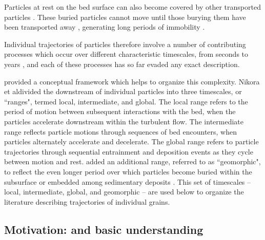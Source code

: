 Particles at rest on the bed surface can also become covered by other transported particles \citep{Yang1971}. 
These buried particles cannot move \DIFdelbegin {}\DIFdelend \DIFaddbegin {}\DIFaddend until those burying them have been transported away \citep{Nakagawa1981}, generating long periods of \DIFaddbegin {}\DIFaddend immobility \citep{Hassan1994,Ferguson2002}.

Individual trajectories of particles therefore involve a number of contributing processes which occur over different characteristic timescales, from seconds to years \citep{Pretzlav2021}, and each of these processes has so far evaded any exact description.

\citet{Nikora2001,Nikora2002} provided a conceptual framework which helps to organize this complexity.
Nikora et al\DIFaddbegin {}\DIFaddend divided the downstream \DIFdelbegin {}\DIFdelend \DIFaddbegin {}\DIFaddend of individual particles into three timescales, or ``ranges", termed local, intermediate, and global.
The local range refers to the period of motion between subsequent interactions with the bed, when the particles accelerate downstream within the turbulent flow.
The intermediate range reflects particle motions through sequences of bed encounters, when particles alternately accelerate and decelerate. 
The global range refers to particle trajectories through sequential entrainment and deposition events as they cycle between motion and rest.
\citet{Hassan2017} added an additional range, referred to as ``geomorphic", to reflect the even longer period over which particles become buried within the subsurface or embedded among sedimentary deposits \citep{Bradley2017}.
This set of timescales -- local, intermediate, global, and geomorphic -- are used below to organize the literature describing trajectories of individual grains.

\subsection{Motivation: \DIFdelbegin {}\DIFdelend \DIFaddbegin {}\DIFaddend and basic understanding}
\DIFaddbegin 

